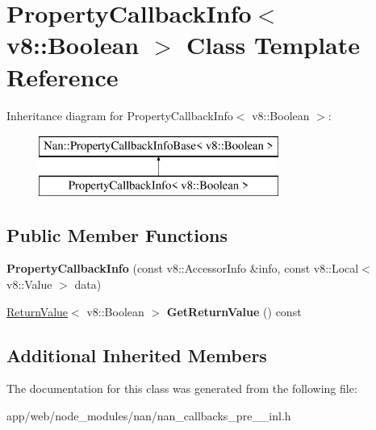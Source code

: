\hypertarget{class_property_callback_info_3_01v8_1_1_boolean_01_4}{}\section{Property\+Callback\+Info$<$ v8\+:\+:Boolean $>$ Class Template Reference}
\label{class_property_callback_info_3_01v8_1_1_boolean_01_4}
Inheritance diagram for Property\+Callback\+Info$<$ v8\+:\+:Boolean $>$\+:\begin{figure}[H]
\begin{center}
\leavevmode
\includegraphics[height=2.000000cm]{class_property_callback_info_3_01v8_1_1_boolean_01_4}
\end{center}
\end{figure}
\subsection*{Public Member Functions}
\begin{DoxyCompactItemize}
\item 
\mbox{\label{class_property_callback_info_3_01v8_1_1_boolean_01_4_a6a996fbf29b0937370b9160565054a34}} 
{\bfseries Property\+Callback\+Info} (const v8\+::\+Accessor\+Info \&info, const v8\+::\+Local$<$ v8\+::\+Value $>$ data)
\item 
\mbox{\label{class_property_callback_info_3_01v8_1_1_boolean_01_4_a512f6de5b0994cb376d776aa513ba3b1}} 
\hyperlink{class_return_value}{Return\+Value}$<$ v8\+::\+Boolean $>$ {\bfseries Get\+Return\+Value} () const
\end{DoxyCompactItemize}
\subsection*{Additional Inherited Members}


The documentation for this class was generated from the following file\+:\begin{DoxyCompactItemize}
\item 
app/web/node\+\_\+modules/nan/nan\+\_\+callbacks\+\_\+pre\+\_\+\_\+inl.\+h\end{DoxyCompactItemize}
